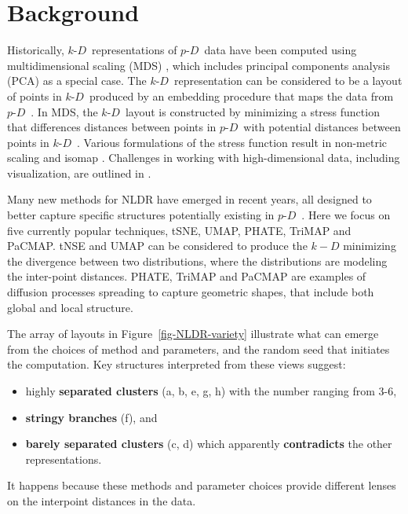 \documentclass[
  12pt]{article}
\providecommand{\tightlist}{%
  \setlength{\itemsep}{0pt}\setlength{\parskip}{0pt}}\usepackage{longtable,booktabs,array}
\def\tightlist{}
\newcommand\pD{$p\text{-}D$\ }
\newcommand\kD{$k\text{-}D$\ }
\begin{document}
\section{Background}\label{sec-background}

Historically, \kD representations of \pD data have been computed using
multidimensional scaling (MDS) \citep{borg2005}, which includes
principal components analysis (PCA) \citep{jolliffe2011} as a special
case. The \kD representation can be considered to be a layout of points
in \kD produced by an embedding procedure that maps the data from \pD.
In MDS, the \kD layout is constructed by minimizing a stress function
that differences distances between points in \pD with potential
distances between points in \kD. Various formulations of the stress
function result in non-metric scaling \citep{saeed2018} and isomap
\citep{silva2002}. Challenges in working with high-dimensional data,
including visualization, are outlined in \citet{johnstone2009}.

Many new methods for NLDR have emerged in recent years, all designed to
better capture specific structures potentially existing in \pD. Here we
focus on five currently popular techniques, tSNE, UMAP, PHATE, TriMAP
and PaCMAP. tNSE and UMAP can be considered to produce the \(k-D\)
minimizing the divergence between two distributions, where the
distributions are modeling the inter-point distances. PHATE, TriMAP and
PaCMAP are examples of diffusion processes \citep{coifman2005} spreading
to capture geometric shapes, that include both global and local
structure.

The array of layouts in Figure~\ref{fig-NLDR-variety} illustrate what
can emerge from the choices of method and parameters, and the random
seed that initiates the computation. Key structures interpreted from
these views suggest:

\begin{itemize}
\tightlist
\item
  highly \textbf{separated clusters} (a, b, e, g, h) with the number
  ranging from 3-6,
\item
  \textbf{stringy branches} (f), and
\item
  \textbf{barely separated clusters} (c, d) which apparently
  \textbf{contradicts} the other representations.
\end{itemize}

It happens because these methods and parameter choices provide different
lenses on the interpoint distances in the data.
\end{document}
